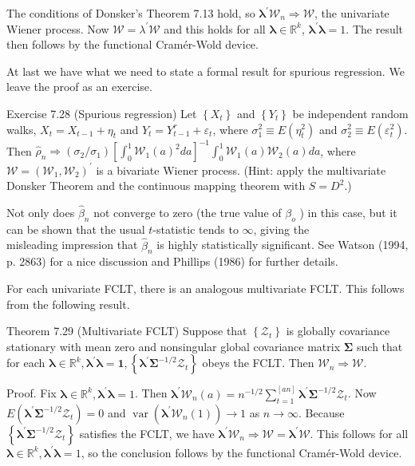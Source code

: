 \documentclass[10pt]{article}
\begin{document}
The conditions of Donsker's Theorem 7.13 hold, so $\boldsymbol{\lambda}^{\prime} \mathcal{W}_{n} \Rightarrow \mathcal{W}$, the univariate Wiener process. Now $\mathcal{W}=\lambda^{\prime} \mathcal{W}$ and this holds for all $\boldsymbol{\lambda} \in \mathbb{R}^{k}$, $\boldsymbol{\lambda}^{\prime} \boldsymbol{\lambda}=1$. The result then follows by the functional Cramér-Wold device.

At last we have what we need to state a formal result for spurious regression. We leave the proof as an exercise.

Exercise 7.28 (Spurious regression) Let $\left\{X_{t}\right\}$ and $\left\{Y_{t}\right\}$ be independent random walks, $X_{t}=X_{t-1}+\eta_{t}$ and $Y_{t}=Y_{t-1}^{r}+\varepsilon_{t}$, where $\sigma_{1}^{2} \equiv E\left(\eta_{t}^{2}\right)$ and $\sigma_{2}^{2} \equiv E\left(\varepsilon_{t}^{2}\right)$. Then $\hat{\rho}_{n} \Rightarrow\left(\sigma_{2} / \sigma_{1}\right)\left[\int_{0}^{1} \mathcal{W}_{1}(a)^{2} d a\right]^{-1} \int_{0}^{1} \mathcal{W}_{1}(a) \mathcal{W}_{2}(a) d a$, where $\mathcal{W}=\left(\mathcal{W}_{1}, \mathcal{W}_{2}\right)^{\prime}$ is a bivariate Wiener process. (Hint: apply the multivariate Donsker Theorem and the continuous mapping theorem with $S=D^{2}$.)

Not only does $\hat{\beta}_{n}$ not converge to zero (the true value of $\beta_{o}$ ) in this case, but it can be shown that the usual $t$-statistic tends to $\infty$, giving the\\
misleading impression that $\hat{\beta}_{n}$ is highly statistically significant. See Watson (1994, p. 2863) for a nice discussion and Phillips (1986) for further details.

For each univariate FCLT, there is an analogous multivariate FCLT. This follows from the following result.

Theorem 7.29 (Multivariate FCLT) Suppose that $\left\{\mathcal{Z}_{t}\right\}$ is globally covariance stationary with mean zero and nonsingular global covariance matrix $\boldsymbol{\Sigma}$ such that for each $\boldsymbol{\lambda} \in \mathbb{R}^{k}, \boldsymbol{\lambda}^{\prime} \boldsymbol{\lambda}=\mathbf{1},\left\{\boldsymbol{\lambda}^{\prime} \boldsymbol{\Sigma}^{-1 / 2} \boldsymbol{\mathcal { Z }}_{t}\right\}$ obeys the FCLT. Then $\mathcal{W}_{n} \Rightarrow \mathcal{W}$.

Proof. Fix $\boldsymbol{\lambda} \in \mathbb{R}^{k}, \boldsymbol{\lambda}^{\prime} \boldsymbol{\lambda}=1$. Then $\boldsymbol{\lambda}^{\prime} \mathcal{W}_{n}(a)=n^{-1 / 2} \sum_{t=1}^{[a n]} \boldsymbol{\lambda}^{\prime} \boldsymbol{\Sigma}^{-1 / 2} \mathcal{Z}_{t}$. Now $E\left(\boldsymbol{\lambda}^{\prime} \boldsymbol{\Sigma}^{-1 / 2} \mathcal{Z}_{t}\right)=0$ and $\operatorname{var}\left(\boldsymbol{\lambda}^{\prime} \mathcal{W}_{n}(1)\right) \rightarrow 1$ as $n \rightarrow \infty$. Because $\left\{\boldsymbol{\lambda}^{\prime} \boldsymbol{\Sigma}^{-1 / 2} \mathcal{Z}_{t}\right\}$ satisfies the FCLT, we have $\boldsymbol{\lambda}^{\prime} \mathcal{W}_{n} \Rightarrow \mathcal{W}=\boldsymbol{\lambda}^{\prime} \mathcal{W}$. This follows for all $\boldsymbol{\lambda} \in \mathbb{R}^{k}, \boldsymbol{\lambda}^{\prime} \boldsymbol{\lambda}=1$, so the conclusion follows by the functional Cramér-Wold device.
\end{document}
